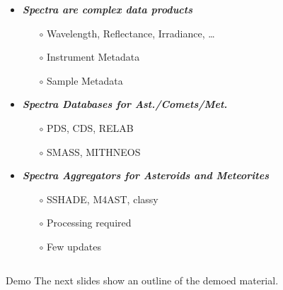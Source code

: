 \begin{frame}
\begin{columns}[T]
    \begin{column}{.7\textwidth}
      \begin{overlayarea}{\textwidth}{\textheight}
        \vspace{1em}

        \begin{itemize}[<.->]
          \item \emph{\bf Spectra are complex data products}
            \begin{itemize}[<.->]
              \item[$\circ$] Wavelength, Reflectance, Irradiance, \dots
              \item[$\circ$] Instrument Metadata
              \item[$\circ$] Sample Metadata
            \end{itemize}
        \vspace{1em}
          \item \emph{\bf Spectra Databases for Ast./Comets/Met.}
            \begin{itemize}[<.->]
              \item[$\circ$] PDS, CDS, RELAB
              \item[$\circ$] SMASS, MITHNEOS
            \end{itemize}
        \vspace{1em}
          \item \emph{\bf Spectra Aggregators for Asteroids and Meteorites}
            \begin{itemize}[<.->]
              \item[$\circ$] SSHADE, M4AST, classy
              \item[$\circ$] Processing required
              \item[$\circ$] Few updates
            \end{itemize}

        \end{itemize}
      \end{overlayarea}
    \end{column}

  \end{columns}

\end{frame}

\begin{frame}[t]{Demo}
  The next slides show an outline of the demoed material.
\end{frame}

